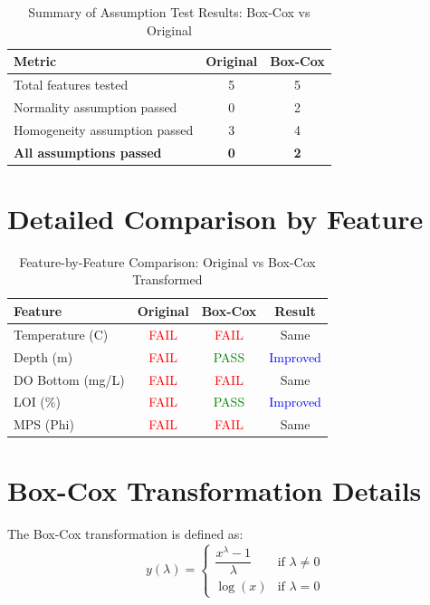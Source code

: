 \documentclass{article}
\begin{document}
\begin{table}[h]
\centering
\caption{Summary of Assumption Test Results: Box-Cox vs Original}
\begin{tabular}{lcc}
\toprule
\textbf{Metric} & \textbf{Original} & \textbf{Box-Cox} \\
\midrule
Total features tested & 5 & 5 \\
Normality assumption passed & 0 & 2 \\
Homogeneity assumption passed & 3 & 4 \\
\textbf{All assumptions passed} & \textbf{0} & \textbf{2} \\
\bottomrule
\end{tabular}
\end{table}

\section{Detailed Comparison by Feature}

\begin{table}[h]
\centering
\caption{Feature-by-Feature Comparison: Original vs Box-Cox Transformed}
\begin{tabular}{p{4cm}ccc}
\toprule
\textbf{Feature} & \textbf{Original} & \textbf{Box-Cox} & \textbf{Result} \\
\midrule
Temperature (\textdegree{}C) & \textcolor{red}{FAIL} & \textcolor{red}{FAIL} & Same \\
Depth (m) & \textcolor{red}{FAIL} & \textcolor{green}{PASS} & \textcolor{blue}{Improved} \\
DO Bottom (mg/L) & \textcolor{red}{FAIL} & \textcolor{red}{FAIL} & Same \\
LOI (\%) & \textcolor{red}{FAIL} & \textcolor{green}{PASS} & \textcolor{blue}{Improved} \\
MPS (Phi) & \textcolor{red}{FAIL} & \textcolor{red}{FAIL} & Same \\

\bottomrule
\end{tabular}
\end{table}

\section{Box-Cox Transformation Details}

The Box-Cox transformation is defined as:
\[
y(\lambda) = 
\begin{cases}
\dfrac{x^\lambda - 1}{\lambda} & \text{if } \lambda \neq 0 \\[6pt]
\log(x) & \text{if } \lambda = 0
\end{cases}
\]
\end{document}
